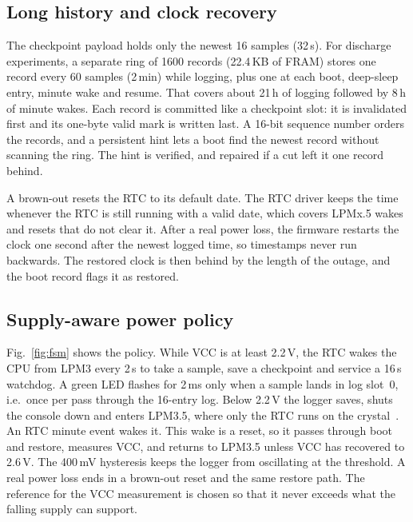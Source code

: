 \documentclass[conference]{IEEEtran}
\begin{document}
\subsection{Long history and clock recovery}

The checkpoint payload holds only the newest 16 samples (32\,s). For discharge experiments, a separate ring of 1600 records (22.4\,KB of FRAM) stores one record every 60 samples (2\,min) while logging, plus one at each boot, deep-sleep entry, minute wake and resume. That covers about 21\,h of logging followed by 8\,h of minute wakes. Each record is committed like a checkpoint slot: it is invalidated first and its one-byte valid mark is written last. A 16-bit sequence number orders the records, and a persistent hint lets a boot find the newest record without scanning the ring. The hint is verified, and repaired if a cut left it one record behind.

A brown-out resets the RTC to its default date. The RTC driver keeps the time whenever the RTC is still running with a valid date, which covers LPMx.5 wakes and resets that do not clear it. After a real power loss, the firmware restarts the clock one second after the newest logged time, so timestamps never run backwards. The restored clock is then behind by the length of the outage, and the boot record flags it as restored.

\subsection{Supply-aware power policy}

Fig.~\ref{fig:fsm} shows the policy. While VCC is at least 2.2\,V, the RTC wakes the CPU from LPM3 every 2\,s to take a sample, save a checkpoint and service a 16\,s watchdog. A green LED flashes for 2\,ms only when a sample lands in log slot~0, i.e.\ once per pass through the 16-entry log. Below 2.2\,V the logger saves, shuts the console down and enters LPM3.5, where only the RTC runs on the crystal~\cite{ti_slau367}. An RTC minute event wakes it. This wake is a reset, so it passes through boot and restore, measures VCC, and returns to LPM3.5 unless VCC has recovered to 2.6\,V. The 400\,mV hysteresis keeps the logger from oscillating at the threshold. A real power loss ends in a brown-out reset and the same restore path. The reference for the VCC measurement is chosen so that it never exceeds what the falling supply can support.
\end{document}

